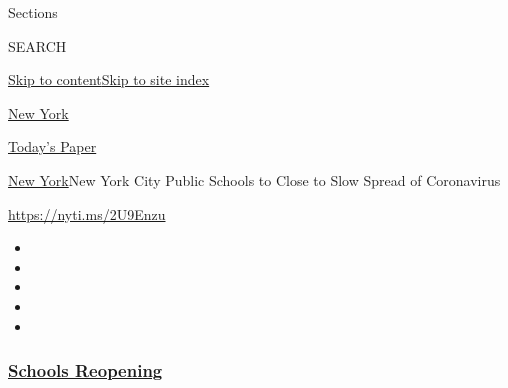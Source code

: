 Sections

SEARCH

\protect\hyperlink{site-content}{Skip to
content}\protect\hyperlink{site-index}{Skip to site index}

\href{https://www.nytimes.com/section/nyregion}{New York}

\href{https://myaccount.nytimes.com/auth/login?response_type=cookie\&client_id=vi}{}

\href{https://www.nytimes.com/section/todayspaper}{Today's Paper}

\href{/section/nyregion}{New York}\textbar{}New York City Public Schools
to Close to Slow Spread of Coronavirus

\url{https://nyti.ms/2U9Enzu}

\begin{itemize}
\item
\item
\item
\item
\item
\end{itemize}

\hypertarget{schools-reopening}{%
\subsubsection{\texorpdfstring{\href{https://www.nytimes.com/spotlight/schools-reopening?name=styln-coronavirus-schools-reopening\&region=TOP_BANNER\&variant=undefined\&block=storyline_menu_recirc\&action=click\&pgtype=Article\&impression_id=1f77e400-e0fd-11ea-8666-1b5a8ddc794b}{Schools
Reopening}}{Schools Reopening}}\label{schools-reopening}}

